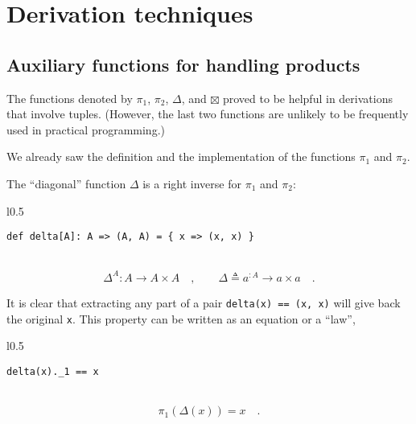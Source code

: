 \section{Derivation techniques}

\subsection{Auxiliary functions for handling products}

The functions denoted by $\pi_{1}$, $\pi_{2}$, $\Delta$, and $\boxtimes$
proved to be helpful in derivations that involve tuples. (However,
the last two functions are unlikely to be frequently used in practical
programming.) 

We already saw the definition and the implementation of the functions
$\pi_{1}$ and $\pi_{2}$. 

The \textsf{``}diagonal\textsf{''} function $\Delta$ is a right inverse for $\pi_{1}$
and $\pi_{2}$:

\begin{wrapfigure}{l}{0.5\columnwidth}%
\vspace{-0.65\baselineskip}
\begin{lstlisting}
def delta[A]: A => (A, A) = { x => (x, x) }
\end{lstlisting}

\vspace{-0.25\baselineskip}
\end{wrapfigure}%

~\vspace{-1.15\baselineskip}
\[
\Delta^{A}:A\rightarrow A\times A\quad,\quad\quad\Delta\triangleq a^{:A}\rightarrow a\times a\quad.
\]
\vspace{-1.15\baselineskip}

It is clear that extracting any part of a pair \lstinline!delta(x) == (x, x)!
will give back the original \lstinline!x!. This property can be written
as an equation or a \textsf{``}law\textsf{''},

\begin{wrapfigure}{l}{0.5\columnwidth}%
\vspace{-0.65\baselineskip}
\begin{lstlisting}
delta(x)._1 == x
\end{lstlisting}

\vspace{-0.25\baselineskip}
\end{wrapfigure}%

~\vspace{-0.35\baselineskip}
\[
\pi_{1}(\Delta(x))=x\quad.
\]
\vspace{-0.85\baselineskip}


